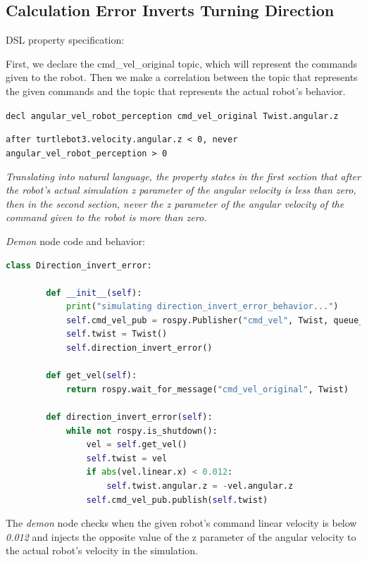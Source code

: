 \subsection{Calculation Error Inverts Turning Direction}
\label{ssec:calculationerrorinvertsturningdirection}

DSL property specification:

First, we declare the cmd\_vel\_original topic, which will represent the commands given to the robot.
Then we make a correlation between the topic that represents the given commands and the topic that represents the actual robot's behavior.

\texttt{decl angular\_vel\_robot\_perception cmd\_vel\_original Twist.angular.z}

\texttt{after turtlebot3.velocity.angular.z < 0, never angular\_vel\_robot\_perception > 0}

\textit{Translating into natural language, the property states in the first section that after the robot's actual simulation z parameter of the angular velocity is less than zero, then in the second section, never the z parameter of the angular velocity of the command given to the robot is more than zero.}

\textit{Demon} node code and behavior:

\begin{lstlisting}[language=python]
    class Direction_invert_error:

        def __init__(self):
            print("simulating direction_invert_error_behavior...")
            self.cmd_vel_pub = rospy.Publisher("cmd_vel", Twist, queue_size=1)
            self.twist = Twist()
            self.direction_invert_error()

        def get_vel(self):
            return rospy.wait_for_message("cmd_vel_original", Twist)

        def direction_invert_error(self):
            while not rospy.is_shutdown():
                vel = self.get_vel()
                self.twist = vel
                if abs(vel.linear.x) < 0.012:
                    self.twist.angular.z = -vel.angular.z
                self.cmd_vel_pub.publish(self.twist)
\end{lstlisting}

The \textit{demon} node checks when the given robot's command linear velocity is below \textit{0.012} and injects the opposite value of the z parameter of the angular velocity to the actual robot's velocity in the simulation.

